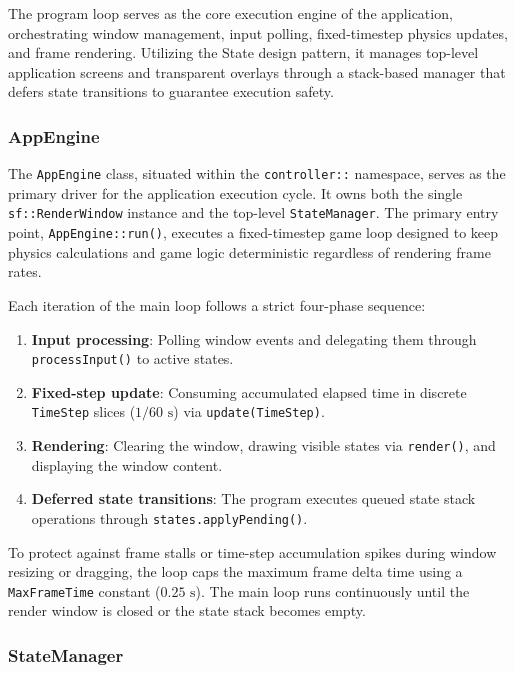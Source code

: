 \documentclass[12pt, a4paper]{article}
\begin{document}
The program loop serves as the core execution engine of the application, orchestrating window management, input polling, fixed-timestep physics updates, and frame rendering. Utilizing the State design pattern, it manages top-level application screens and transparent overlays through a stack-based manager that defers state transitions to guarantee execution safety.

\subsubsection{AppEngine}

The \texttt{AppEngine} class, situated within the \texttt{controller::} namespace, serves as the primary driver for the application execution cycle. It owns both the single \texttt{sf::RenderWindow} instance and the top-level \texttt{StateManager}. The primary entry point, \texttt{AppEngine::run()}, executes a fixed-timestep game loop designed to keep physics calculations and game logic deterministic regardless of rendering frame rates.

Each iteration of the main loop follows a strict four-phase sequence:
\begin{enumerate}
\item \textbf{Input processing}: Polling window events and delegating them through \texttt{processInput()} to active states.
\item \textbf{Fixed-step update}: Consuming accumulated elapsed time in discrete \texttt{TimeStep} slices ($1/60\text{ s}$) via \texttt{update(TimeStep)}.
\item \textbf{Rendering}: Clearing the window, drawing visible states via \texttt{render()}, and displaying the window content.
\item \textbf{Deferred state transitions}: The program executes queued state stack operations through \texttt{states.applyPending()}.
\end{enumerate}

To protect against frame stalls or time-step accumulation spikes during window resizing or dragging, the loop caps the maximum frame delta time using a \texttt{MaxFrameTime} constant ($0.25\text{ s}$). The main loop runs continuously until the render window is closed or the state stack becomes empty.

\newpage

\subsubsection{StateManager}
\end{document}
